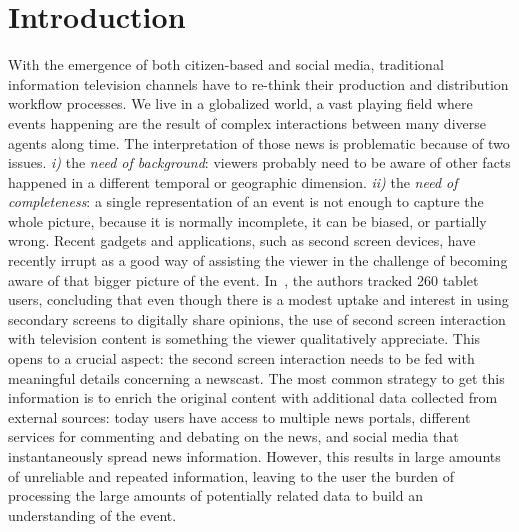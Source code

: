 \documentclass{llncs}
\begin{document}
\section{Introduction}
\label{sec:introduction}
With the emergence of both citizen-based and social media, traditional information television channels have to re-think their production and distribution workflow processes. We live in a globalized world, a vast playing field where events happening are the result of complex interactions between many diverse agents along time. The interpretation of those news is problematic because of two issues. \textit{i)} the \textit{need of background}: viewers probably need to be aware of other facts happened in a different temporal or geographic dimension.
\textit{ii)} the \textit{need of completeness}: a single representation of an event is not enough to capture the whole picture, because it is normally incomplete, it can be biased, or partially wrong. 
Recent gadgets and applications, such as second screen devices, have recently irrupt as a good way of assisting the viewer in the challenge of becoming aware of
that bigger picture of the event. In~\cite{Courtois2012}, the authors tracked 260 tablet users, concluding that even though there is a modest uptake and interest in using secondary screens to digitally share opinions, the use of second screen interaction with television content is something the viewer qualitatively appreciate.
This opens to a crucial aspect: the second screen interaction needs to be fed with meaningful details concerning a newscast. The most common strategy to get this information is to enrich the original content with additional data collected from external sources: today users have access to multiple news portals, different services for commenting and debating on the news, and social media that instantaneously spread news information. However, this results in large amounts of unreliable and repeated information, leaving to the user the burden of processing the large amounts of potentially related data to build an understanding of the event.
\end{document}
